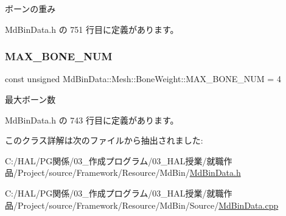 ボーンの重み 



 Md\+Bin\+Data.\+h の 751 行目に定義があります。

\mbox{\label{class_md_bin_data_1_1_mesh_1_1_bone_weight_a2c870f6c96315b6b9630cff3c24b79e7}} 
\subsubsection{\texorpdfstring{M\+A\+X\+\_\+\+B\+O\+N\+E\+\_\+\+N\+UM}{MAX\_BONE\_NUM}}
{\footnotesize\ttfamily const unsigned Md\+Bin\+Data\+::\+Mesh\+::\+Bone\+Weight\+::\+M\+A\+X\+\_\+\+B\+O\+N\+E\+\_\+\+N\+UM = 4\hspace{0.3cm}{\ttfamily [static]}}



最大ボーン数 



 Md\+Bin\+Data.\+h の 743 行目に定義があります。



このクラス詳解は次のファイルから抽出されました\+:\begin{DoxyCompactItemize}
\item 
C\+:/\+H\+A\+L/\+P\+G関係/03\+\_\+作成プログラム/03\+\_\+\+H\+A\+L授業/就職作品/\+Project/source/\+Framework/\+Resource/\+Md\+Bin/\mbox{\hyperlink{_md_bin_data_8h}{Md\+Bin\+Data.\+h}}\item 
C\+:/\+H\+A\+L/\+P\+G関係/03\+\_\+作成プログラム/03\+\_\+\+H\+A\+L授業/就職作品/\+Project/source/\+Framework/\+Resource/\+Md\+Bin/\+Source/\mbox{\hyperlink{_md_bin_data_8cpp}{Md\+Bin\+Data.\+cpp}}\end{DoxyCompactItemize}
